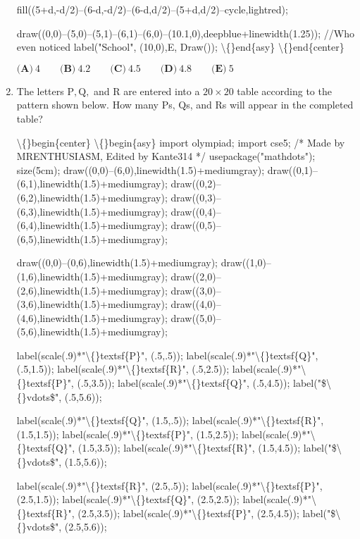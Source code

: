 \documentclass{article}
\begin{document}
\begin{enumerate}[label=\arabic*., itemsep=0.5em]
fill((5+d,-d/2)--(6-d,-d/2)--(6-d,d/2)--(5+d,d/2)--cycle,lightred);

draw((0,0)--(5,0)--(5,1)--(6,1)--(6,0)--(10.1,0),deepblue+linewidth(1.25)); //Who even noticed
label("School", (10,0),E, Draw());
\textbackslash\{\}end\{asy\}
\textbackslash\{\}end\{center\}

\(\textbf{(A)}\ 4 \qquad \textbf{(B)}\ 4.2 \qquad \textbf{(C)}\ 4.5 \qquad \textbf{(D)}\ 4.8 \qquad \textbf{(E)}\ 5\)\par \vspace{0.5em}\item The letters \(\text{P}, \text{Q},\) and \(\text{R}\) are entered into a \(20\times20\) table according to the pattern shown below. How many \(\text{P}\)s, \(\text{Q}\)s, and \(\text{R}\)s will appear in the completed table? 

\textbackslash\{\}begin\{center\}
\textbackslash\{\}begin\{asy\}
import olympiad;
import cse5;
/* Made by MRENTHUSIASM, Edited by Kante314 */
usepackage("mathdots");
size(5cm);
draw((0,0)--(6,0),linewidth(1.5)+mediumgray);
draw((0,1)--(6,1),linewidth(1.5)+mediumgray);
draw((0,2)--(6,2),linewidth(1.5)+mediumgray);
draw((0,3)--(6,3),linewidth(1.5)+mediumgray);
draw((0,4)--(6,4),linewidth(1.5)+mediumgray);
draw((0,5)--(6,5),linewidth(1.5)+mediumgray);

draw((0,0)--(0,6),linewidth(1.5)+mediumgray);
draw((1,0)--(1,6),linewidth(1.5)+mediumgray);
draw((2,0)--(2,6),linewidth(1.5)+mediumgray);
draw((3,0)--(3,6),linewidth(1.5)+mediumgray);
draw((4,0)--(4,6),linewidth(1.5)+mediumgray);
draw((5,0)--(5,6),linewidth(1.5)+mediumgray);

label(scale(.9)*"\textbackslash\{\}textsf\{P\}", (.5,.5));
label(scale(.9)*"\textbackslash\{\}textsf\{Q\}", (.5,1.5));
label(scale(.9)*"\textbackslash\{\}textsf\{R\}", (.5,2.5));
label(scale(.9)*"\textbackslash\{\}textsf\{P\}", (.5,3.5));
label(scale(.9)*"\textbackslash\{\}textsf\{Q\}", (.5,4.5));
label("\$\textbackslash\{\}vdots\$", (.5,5.6));

label(scale(.9)*"\textbackslash\{\}textsf\{Q\}", (1.5,.5));
label(scale(.9)*"\textbackslash\{\}textsf\{R\}", (1.5,1.5));
label(scale(.9)*"\textbackslash\{\}textsf\{P\}", (1.5,2.5));
label(scale(.9)*"\textbackslash\{\}textsf\{Q\}", (1.5,3.5));
label(scale(.9)*"\textbackslash\{\}textsf\{R\}", (1.5,4.5));
label("\$\textbackslash\{\}vdots\$", (1.5,5.6));

label(scale(.9)*"\textbackslash\{\}textsf\{R\}", (2.5,.5));
label(scale(.9)*"\textbackslash\{\}textsf\{P\}", (2.5,1.5));
label(scale(.9)*"\textbackslash\{\}textsf\{Q\}", (2.5,2.5));
label(scale(.9)*"\textbackslash\{\}textsf\{R\}", (2.5,3.5));
label(scale(.9)*"\textbackslash\{\}textsf\{P\}", (2.5,4.5));
label("\$\textbackslash\{\}vdots\$", (2.5,5.6));


\end{enumerate}
\end{document}
